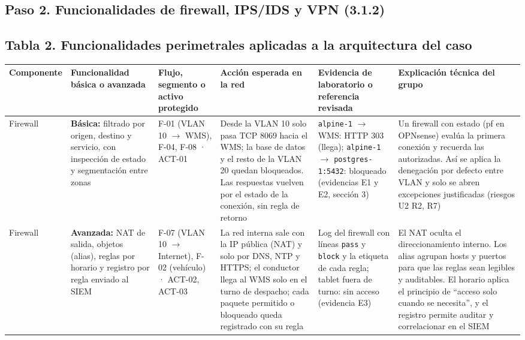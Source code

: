 \documentclass[11pt,a4paper]{article}
\newcommand{\ra}{\ensuremath{\rightarrow}}
\newcommand{\cd}[1]{\texttt{#1}}
\begin{document}
\begin{landscape}
\section{Paso 2. Funcionalidades de firewall, IPS/IDS y VPN (3.1.2)}

\subsection{Tabla 2. Funcionalidades perimetrales aplicadas a la arquitectura del caso}

{\footnotesize
\setlength{\tabcolsep}{3pt}
\renewcommand{\arraystretch}{1.05}
\begin{longtable}{@{}P{2.0cm}P{3.4cm}P{2.7cm}P{4.3cm}P{4.3cm}P{5.7cm}@{}}
\toprule
\textbf{Componente} & \textbf{Funcionalidad básica o avanzada} & \textbf{Flujo, segmento o activo protegido} & \textbf{Acción esperada en la red} & \textbf{Evidencia de laboratorio o referencia revisada} & \textbf{Explicación técnica del grupo} \\ \midrule
\endhead
Firewall & \textbf{Básica:} filtrado por origen, destino y servicio, con inspección de estado y segmentación entre zonas & F-01 (VLAN 10 \ra{} WMS), F-04, F-08 · ACT-01 & Desde la VLAN 10 solo pasa TCP 8069 hacia el WMS; la base de datos y el resto de la VLAN 20 quedan bloqueados. Las respuestas vuelven por el estado de la conexión, sin regla de retorno & \cd{alpine-1} \ra{} WMS: HTTP 303 (llega); \cd{alpine-1} \ra{} \cd{postgres-1:5432}: bloqueado (evidencias E1 y E2, sección 3) & Un firewall con estado (pf en OPNsense) evalúa la primera conexión y recuerda las autorizadas. Así se aplica la denegación por defecto entre VLAN y solo se abren excepciones justificadas (riesgos U2 R2, R7) \\ \midrule
Firewall & \textbf{Avanzada:} NAT de salida, objetos (alias), reglas por horario y registro por regla enviado al SIEM & F-07 (VLAN 10 \ra{} Internet), F-02 (vehículo) · ACT-02, ACT-03 & La red interna sale con la IP pública (NAT) y solo por DNS, NTP y HTTPS; el conductor llega al WMS solo en el turno de despacho; cada paquete permitido o bloqueado queda registrado con su regla & Log del firewall con líneas \cd{pass} y \cd{block} y la etiqueta de cada regla; tablet fuera de turno: sin acceso (evidencia E3) & El NAT oculta el direccionamiento interno. Los alias agrupan hosts y puertos para que las reglas sean legibles y auditables. El horario aplica el principio de ``acceso solo cuando se necesita'', y el registro permite auditar y correlacionar en el SIEM \\ \midrule

\end{longtable}}
\end{landscape}
\end{document}
